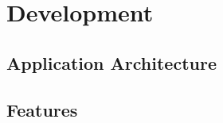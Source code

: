 \chapter{Development}
\section{Application Architecture}
\label{sec:architecture}
\section{Features}
